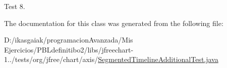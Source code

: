 Test 8. 

The documentation for this class was generated from the following file\+:\begin{DoxyCompactItemize}
\item 
D\+:/ikasgaiak/programacion\+Avanzada/\+Mis Ejercicios/\+P\+B\+Ldefinitibo2/libs/jfreechart-\/1../tests/org/jfree/chart/axis/\mbox{\hyperlink{_segmented_timeline_additional_test_8java}{Segmented\+Timeline\+Additional\+Test.\+java}}\end{DoxyCompactItemize}
